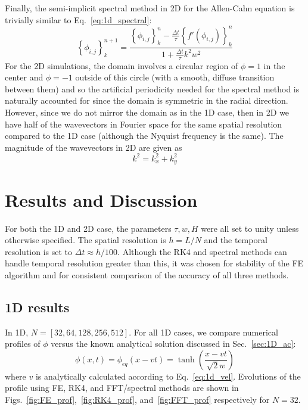 \documentclass[12pt]{article}
\newcommand{\refeq}[1]{Eq.~\eqref{#1}}
\newcommand{\dt}{\Delta t}
\begin{document}
Finally, the semi-implicit spectral method in 2D for the Allen-Cahn equation is trivially similar to \refeq{eq:1d_spectral}:
\begin{equation}
    \left\{\phi_{i,j}\right\}_k^{n+1}  = \frac{\left\{\phi_{i,j}\right\}_k^n - \frac{\dt}{\tau}\left\{f'(\phi_{i,j})\right\}_k^n}{1 + \frac{\dt}{\tau} k^2 w^2 } \label{eq:2d_spectral}
\end{equation}
For the 2D simulations, the domain involves a circular region of $\phi = 1$ in the center and $\phi=-1$ outside of this circle (with a smooth, diffuse transition between them) and so the artificial periodicity needed for the spectral method is naturally accounted for since the domain is symmetric in the radial direction.
However, since we do not mirror the domain as in the 1D case, then in 2D we have half of the wavevectors in Fourier space for the same spatial resolution compared to the 1D case (although the Nyquist frequency is the same).
The magnitude of the wavevectors in 2D are given as
\begin{equation}
    k^2 = k_x^2 + k_y^2
\end{equation}

\section{Results and Discussion}
For both the 1D and 2D case, the parameters $\tau, w, H$ were all set to unity unless otherwise specified.
The spatial resolution is $h = L / N$ and the temporal resolution is set to $\dt \approx h/100$. 
Although the RK4 and spectral methods can handle temporal resolution greater than this, it was chosen for stability of the FE algorithm and for consistent comparison of the accuracy of all three methods.

\subsection{1D results}
In 1D, $N = [32, 64, 128, 256, 512]$.
For all 1D cases, we compare numerical profiles of $\phi$ versus the known analytical solution discussed in Sec.~\ref{sec:1D_ac}:
\begin{equation}
    \phi(x,t) = \phi_{eq}(x-vt) = \tanh \left(\frac{x - vt}{\sqrt{2} w}\right)
\end{equation}
where $v$ is analytically calculated according to \refeq{eq:1d_vel}.
Evolutions of the profile using FE, RK4, and FFT/spectral methods are shown in Figs.~\ref{fig:FE_prof},~\ref{fig:RK4_prof}, and~\ref{fig:FFT_prof} respectively for $N=32$.
\end{document}
